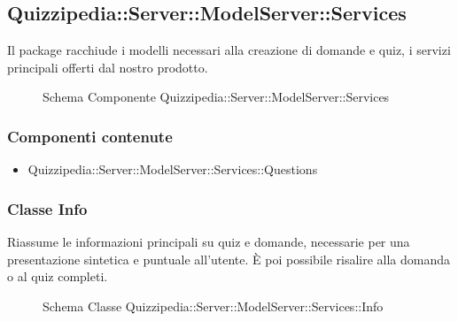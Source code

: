 \subsection{Quizzipedia::Server::ModelServer::Services}
Il package racchiude i modelli necessari alla creazione di domande e quiz, i servizi principali offerti dal nostro prodotto.
\begin{figure}[H]
\centering
\noindent{}
\caption[Quizzipedia::Server::ModelServer::Services]{Schema Componente Quizzipedia::Server::ModelServer::Services}
\end{figure}
\subsubsection{Componenti contenute}
\begin{itemize}
\item Quizzipedia::Server::ModelServer::Services::Questions
\end{itemize}
\subsubsection{Classe Info}
Riassume le informazioni principali su quiz e domande, necessarie per una presentazione sintetica e puntuale all'utente. È poi possibile risalire alla domanda o al quiz completi.
\begin{figure}[H]
\centering
\noindent{}
\caption{Schema Classe Quizzipedia::Server::ModelServer::Services::Info}
\end{figure}
